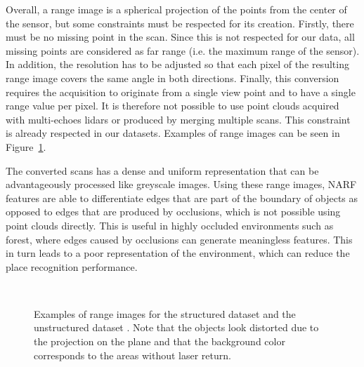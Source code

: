 Overall, a range image is a spherical projection of the points from the center of the sensor, but some constraints must be respected for its creation. Firstly, there must be no missing point in the scan. Since this is not respected for our data, all missing points are considered as far range (i.e. the maximum range of the sensor). In addition, the resolution has to be adjusted so that each pixel of the resulting range image covers the same angle in both directions. Finally, this conversion requires the acquisition to originate from a single view point and to have a single range value per pixel. It is therefore not possible to use point clouds acquired with multi-echoes \gls*{lidar}s or produced by merging multiple scans. This constraint is already respected in our datasets. Examples of range images can be seen in Figure~\ref{fig:chap_slam_range}.

The converted scans has a dense and uniform representation that can be advantageously processed like greyscale images. Using these range images, NARF features are able to differentiate edges that are part of the boundary of objects as opposed to edges that are produced by occlusions, which is not possible using point clouds directly. This is useful in highly occluded environments such as forest, where edges caused by occlusions can generate meaningless features. This in turn leads to a poor representation of the environment, which can reduce the place recognition performance.


\begin{figure}[H]
    \centering
    \\
    \caption{Examples of range images for the structured dataset \protect{} and the unstructured dataset \protect{}. Note that the objects look distorted due to the projection on the plane and that the background color corresponds to the areas without laser return.}
    \label{fig:chap_slam_range}
\end{figure}


